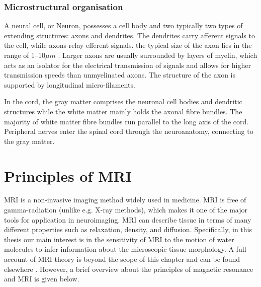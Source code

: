 \subsubsection{Microstructural organisation}
A neural cell, or Neuron, possesses a cell body and two typically two types of extending structures: axons and dendrites. The dendrites carry afferent signals to the cell, while axons relay efferent signals. the typical size of the axon lies in the range of 1--10$\mu m$ \citep{Waxman:1989,Beaulieu:2002}. Larger axons are usually surrounded by layers of myelin, which acts as an isolator for the electrical transmission of signals and allows for higher transmission speeds than unmyelinated axons. The structure of the axon is supported by longitudinal micro-filaments\citep{Beaulieu:2002}.

In the cord, the gray matter comprises the neuronal cell bodies and dendritic structures while the white matter mainly holds the axonal fibre bundles. The majority of white matter fibre bundles run parallel to the long axis of the cord. Peripheral nerves enter the spinal cord through the neuroanatomy, connecting to the gray matter\citep{Carpenter:1991}. 

\section{Principles of MRI}
\Gls{MRI} is a non-invasive imaging method widely used in medicine. \gls{MRI} is free of gamma-radiation (unlike e.g. X-ray methods), which makes it one of the major tools for application in neuroimaging. \Gls{MRI} can describe tissue in terms of many different properties such as relaxation, density, and diffusion. Specifically, in this thesis our main interest is in the sensitivity of MRI to the motion of water molecules to infer information about the microscopic tissue morphology. A full account of \gls{MRI} theory is beyond the scope of this chapter and can be found elsewhere \citep{McRobbie:2002,Bernstein:2004}. However, a brief overview about the principles of magnetic resonance and \gls{MRI} is given below.

